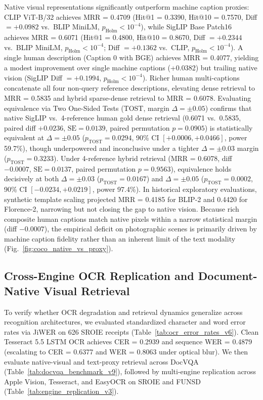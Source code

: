 Native visual representations significantly outperform machine caption proxies: CLIP ViT-B/32 \cite{radford2021clip} achieves MRR = 0.4709 (Hit@1 = 0.3390, Hit@10 = 0.7570, Diff $= +0.0982$ vs.\ BLIP MiniLM, $p_{\text{Holm}} < 10^{-4}$), while SigLIP Base Patch16 \cite{zhai2023siglip} achieves MRR = 0.6071 (Hit@1 = 0.4800, Hit@10 = 0.8670, Diff $= +0.2344$ vs.\ BLIP MiniLM, $p_{\text{Holm}} < 10^{-4}$; Diff $= +0.1362$ vs.\ CLIP, $p_{\text{Holm}} < 10^{-4}$).
A single human description (Caption 0 with BGE) achieves MRR = 0.4077, yielding a modest improvement over single machine captions (+0.0382) but trailing native vision (SigLIP Diff $= +0.1994$, $p_{\text{Holm}} < 10^{-4}$). Richer human multi-captions concatenate all four non-query reference descriptions, elevating dense retrieval to MRR = 0.5835 and hybrid sparse-dense retrieval to MRR = 0.6078. Evaluating equivalence via Two One-Sided Tests (TOST, margin $\Delta = \pm 0.05$) confirms that native SigLIP vs.\ 4-reference human gold dense retrieval (0.6071 vs.\ 0.5835, paired diff $+0.0236$, $\text{SE} = 0.0139$, paired permutation $p = 0.0905$) is statistically equivalent at $\Delta = \pm 0.05$ ($p_{\text{TOST}} = 0.0294$, 90\% CI $[+0.0006, +0.0466]$, power 59.7\%), though underpowered and inconclusive under a tighter $\Delta = \pm 0.03$ margin ($p_{\text{TOST}} = 0.3233$). Under 4-reference hybrid retrieval (MRR = 0.6078, diff $-0.0007$, $\text{SE} = 0.0137$, paired permutation $p = 0.9563$), equivalence holds decisively at both $\Delta = \pm 0.03$ ($p_{\text{TOST}} = 0.0167$) and $\Delta = \pm 0.05$ ($p_{\text{TOST}} = 0.0002$, 90\% CI $[-0.0234, +0.0219]$, power 97.4\%). In historical exploratory evaluations, synthetic template scaling projected MRR = 0.4185 for BLIP-2 and 0.4420 for Florence-2, narrowing but not closing the gap to native vision. Because rich composite human captions match native pixels within a narrow statistical margin (diff $-0.0007$), the empirical deficit on photographic scenes is primarily driven by machine caption fidelity rather than an inherent limit of the text modality (Fig.~\ref{fig:coco_native_vs_proxy}).

\subsection{Cross-Engine OCR Replication and Document-Native Visual Retrieval}
\label{sec:cross_engine_replication}

To verify whether OCR degradation and retrieval dynamics generalize across recognition architectures, we evaluated standardized character and word error rates via JiWER \cite{vaessen2024jiwer} on 626 SROIE receipts (Table~\ref{tab:ocr_error_rates_v6}). Clean Tesseract 5.5 LSTM OCR \cite{smith2007tesseract} achieves CER = 0.2939 and sequence WER = 0.4879 (escalating to CER = 0.6377 and WER = 0.8063 under optical blur). We then evaluate native-visual and text-proxy retrieval across DocVQA (Table~\ref{tab:docvqa_benchmark_v9}), followed by multi-engine replication across Apple Vision, Tesseract, and EasyOCR on SROIE and FUNSD (Table~\ref{tab:engine_replication_v3}).

